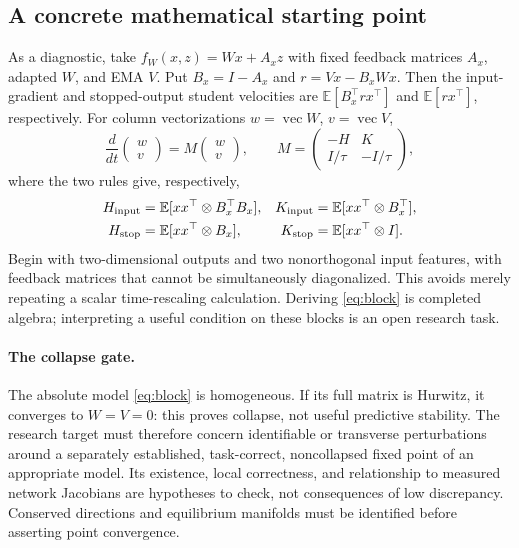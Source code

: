 \documentclass[11pt,a4paper]{article}
\newcommand{\E}{\mathbb{E}}
\begin{document}
\subsection{A concrete mathematical starting point}
As a diagnostic, take $f_W(x,z)=Wx+A_xz$ with fixed feedback matrices
$A_x$, adapted $W$, and EMA $V$. Put $B_x=I-A_x$ and $r=Vx-B_xWx$.
Then the input-gradient and stopped-output student velocities are
$\E[B_x^\top r x^\top]$ and $\E[r x^\top]$, respectively. For column
vectorizations $w=\operatorname{vec}W$, $v=\operatorname{vec}V$,
\begin{equation}
 \frac{d}{dt}\begin{pmatrix}w\\v\end{pmatrix}
 =M\begin{pmatrix}w\\v\end{pmatrix},\qquad
 M=\begin{pmatrix}-H&K\\I/\tau&-I/\tau\end{pmatrix},
 \label{eq:block}
\end{equation}
where the two rules give, respectively,
\begin{align}
 H_{\rm input}&=\E[xx^\top\otimes B_x^\top B_x],&
 K_{\rm input}&=\E[xx^\top\otimes B_x^\top],\nonumber\\
 H_{\rm stop}&=\E[xx^\top\otimes B_x],&
 K_{\rm stop}&=\E[xx^\top\otimes I].
 \label{eq:blocks}
\end{align}
Begin with two-dimensional outputs and two nonorthogonal input features,
with feedback matrices that cannot be simultaneously diagonalized. This
avoids merely repeating a scalar time-rescaling calculation. Deriving
\eqref{eq:block} is completed algebra; interpreting a useful condition on
these blocks is an open research task.

\paragraph{The collapse gate.}
The absolute model \eqref{eq:block} is homogeneous. If its full matrix is
Hurwitz, it converges to $W=V=0$: this proves collapse, not useful predictive
stability. The research target must therefore concern identifiable or
transverse perturbations around a separately established, task-correct,
noncollapsed fixed point of an appropriate model. Its existence, local
correctness, and relationship to measured network Jacobians are hypotheses
to check, not consequences of low discrepancy. Conserved directions and
equilibrium manifolds must be identified before asserting point convergence.
\end{document}
